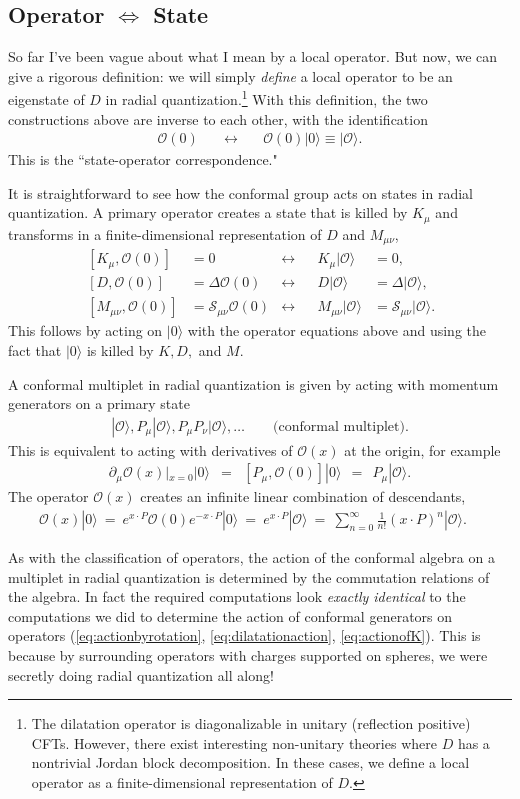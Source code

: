 \documentclass[11pt]{ws-rv9x6}
\newcommand\be{\begin{eqnarray}}
\newcommand\ee{\end{eqnarray}}
\newcommand\cO{\mathcal{O}}
\newcommand\ptl\partial
\newcommand\<\langle
\renewcommand\>\rangle
\renewcommand\.{\cdot}
\newcommand\De{\Delta}
\newcommand\cS{\mathcal{S}}
\newcommand\oo\infty
\begin{document}
\subsection{Operator $\Longleftrightarrow$ State}

So far I've been vague about what I mean by a local operator.  But now, we can give a rigorous definition: we will simply {\it define\/} a local operator to be an eigenstate of $D$ in radial quantization.\footnote{The dilatation operator is diagonalizable in unitary (reflection positive) CFTs.  However, there exist interesting non-unitary theories where $D$ has a nontrivial Jordan block decomposition.  In these cases, we define a local operator as a finite-dimensional representation of $D$.} With this definition, the two constructions above are inverse to each other, with the identification
\be
\cO(0)\quad &\longleftrightarrow& \quad \cO(0)|0\>\equiv |\cO\>.
\ee
This is the ``state-operator correspondence."

It is straightforward to see how the conformal group acts on states in radial quantization.  A primary operator creates a state that is killed by $K_\mu$ and transforms in a finite-dimensional representation of $D$ and $M_{\mu\nu}$,
\begin{align}
\label{eq:operatortostateconditionK}
\,[K_\mu,\cO(0)]&=0 &\longleftrightarrow && K_\mu|\cO\>&=0,\\
\label{eq:operatortostateconditionD}
\,[D,\cO(0)] &= \De\cO(0) &\longleftrightarrow&& D|\cO\>&=\De|\cO\>,\\
\label{eq:operatortostateconditionM}
\,[M_{\mu\nu},\cO(0)]&=\cS_{\mu\nu}\cO(0) &\longleftrightarrow&& M_{\mu\nu}|\cO\> &= \cS_{\mu\nu}|\cO\>.
\end{align}
This follows by acting on $|0\>$ with the operator equations above and using the fact that $|0\>$ is killed by $K,D,$ and $M$.

A conformal multiplet in radial quantization is given by acting with momentum generators on a primary state
\be
|\cO\>, P_\mu|\cO\>, P_\mu P_\nu|\cO\>, \dots \qquad\textrm{(conformal multiplet)}.
\ee
This is equivalent to acting with derivatives of $\cO(x)$ at the origin, for example
\be
\ptl_\mu\cO(x)|_{x=0}|0\> &=& [P_\mu,\cO(0)]|0\>\ \ =\ \ P_\mu|\cO\>.
\ee
The operator $\cO(x)$ creates an infinite linear combination of descendants,
\be
\cO(x)|0\>\ =\  e^{x\.P}\cO(0)e^{-x\.P}|0\>\ =\ e^{x\.P}|\cO\>\ =\ \sum_{n=0}^\oo \frac{1}{n!}(x\.P)^n|\cO\>.\quad
\ee

As with the classification of operators, the action of the conformal algebra on a multiplet in radial quantization is determined by the commutation relations of the algebra. In fact the required computations look {\it exactly identical\/} to the computations we did to determine the action of conformal generators on operators (\ref{eq:actionbyrotation}, \ref{eq:dilatationaction}, \ref{eq:actionofK}).  This is because by surrounding operators with charges supported on spheres, we were secretly doing radial quantization all along!
\end{document}
